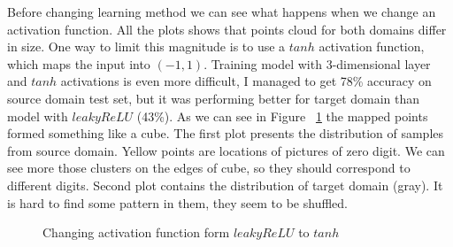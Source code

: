 \documentclass{article}
\begin{document}
Before changing learning method we can see what happens when we change an activation function. All the plots shows that points cloud for both domains differ in size. One way to limit this magnitude is to use a $tanh$ activation function, which maps the input into $(-1, 1)$. Training model with 3-dimensional layer and $tanh$ activations is even more difficult, I managed to get 78\% accuracy on source domain test set, but it was performing better for target domain than model with $leaky ReLU$ (43\%).  As we can see in Figure ~\ref{fig:tanh} the mapped points formed something like a cube. The first plot presents the distribution of samples from source domain. Yellow points are locations of pictures of zero digit. We can see more those clusters on the edges of cube, so they should correspond to different digits. Second plot contains the distribution of target domain (gray). It is hard to find some pattern in them, they seem to be shuffled.

\begin{figure}[htb]%
\captionsetup[subfigure]{labelformat=empty}
    \centering
    \qquad
    \caption{Changing activation function form $leaky ReLU$ to $tanh$}%
    \label{fig:tanh}%
\end{figure}
\end{document}
